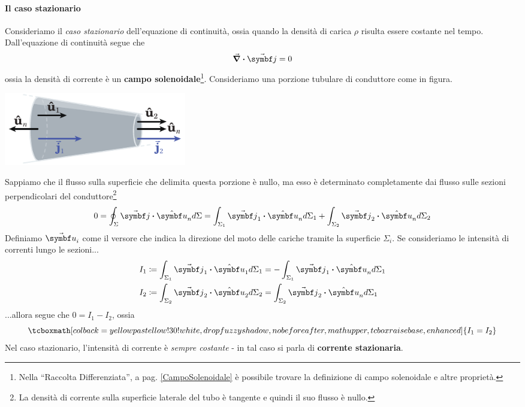\paragraph{Il caso stazionario}
	Consideriamo il \textit{caso stazionario} dell'equazione di continuità, ossia quando la densità di carica $\rho$ risulta essere costante nel tempo. Dall'equazione di continuità segue  che
	\begin{equation*}
		\div{\vba{j}}=0
	\end{equation*}
	ossia la densità di corrente è un \textbf{campo solenoidale}\footnote{Nella ``Raccolta Differenziata'', a pag. \ref{CampoSolenoidale} è possibile trovare la definizione di campo solenoidale e altre proprietà.}. Consideriamo una porzione tubulare di conduttore come in figura.
	\begin{center}
		\includegraphics[width=0.35\textwidth]{images/chp5/chp5casostazionario.pdf}
	\end{center}
	Sappiamo che il flusso sulla superficie che delimita questa porzione è nullo, ma esso è determinato completamente dai flusso sulle sezioni perpendicolari del conduttore\footnote{La densità di corrente sulla superficie laterale del tubo è tangente e quindi il suo flusso è nullo.}
	\begin{equation*}
		0=\oint_{\Sigma}\vba{j}\vdot\vbh{u}_nd\Sigma=\int_{\Sigma_1}\vba{j}_1\vdot\vbh{u}_nd\Sigma_1+\int_{\Sigma_2}\vba{j}_2\vdot\vbh{u}_nd\Sigma_2
	\end{equation*}
	Definiamo $\vba{u}_i$ come il versore che indica la direzione del moto delle cariche tramite la superficie $\Sigma_i$. Se consideriamo le intensità di correnti lungo le sezioni...
	\begin{align*}
		I_1&\coloneqq\int_{\Sigma_1}\vba{j}_1\vdot\vbh{u}_1d\Sigma_1=-\int_{\Sigma_1}\vba{j}_1\vdot\vbh{u}_nd\Sigma_1\\
		I_2&\coloneqq\int_{\Sigma_2}\vba{j}_2\vdot\vbh{u}_2d\Sigma_2=\int_{\Sigma_2}\vba{j}_2\vdot\vbh{u}_nd\Sigma_1
	\end{align*}
	...allora segue che $0=I_1-I_2$, ossia
	\begin{equation}
			\tcboxmath[colback=yellowpastellow!30!white,drop fuzzy shadow, nobeforeafter, math upper, tcbox raise base, enhanced]{I_1=I_2}
	\end{equation}
Nel caso stazionario, l'intensità di corrente è \textit{sempre costante} - in tal caso si parla di \textbf{corrente stazionaria}.
